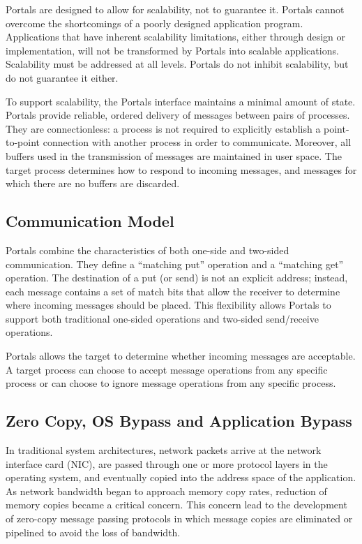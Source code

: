 \documentclass{sand-report}
\begin{document}
Portals are designed to allow for scalability, not to guarantee it.
Portals cannot overcome the shortcomings of a poorly designed
application program.  Applications that have inherent scalability
limitations, either through design or implementation, will not be
transformed by Portals into scalable applications.  Scalability must
be addressed at all levels.  Portals do not inhibit scalability, but
do not guarantee it either.

To support scalability, the Portals interface maintains a minimal
amount of state.  Portals provide reliable, ordered delivery of
messages between pairs of processes.  They are connectionless: a
process is not required to explicitly establish a point-to-point
connection with another process in order to communicate.  Moreover,
all buffers used in the transmission of messages are maintained in
user space.  The target process determines how to respond to incoming
messages, and messages for which there are no buffers are discarded.

\subsection{Communication Model}

Portals combine the characteristics of both one-side and two-sided
communication.  They define a ``matching put'' operation and a
``matching get'' operation.  The destination of a put (or send) is not
an explicit address; instead, each message contains a set of match
bits that allow the receiver to determine where incoming messages
should be placed.  This flexibility allows Portals to support both
traditional one-sided operations and two-sided send/receive
operations.

Portals allows the target to determine whether incoming messages are
acceptable.  A target process can choose to accept message operations
from any specific process or can choose to ignore message operations
from any specific process.  

\subsection{Zero Copy, OS Bypass and Application Bypass}

In traditional system architectures, network packets arrive at the
network interface card (NIC), are passed through one or more protocol
layers in the operating system, and eventually copied into the address
space of the application.  As network bandwidth began to approach
memory copy rates, reduction of memory copies became a critical
concern.  This concern lead to the development of zero-copy message
passing protocols in which message copies are eliminated or pipelined
to avoid the loss of bandwidth.
\end{document}
